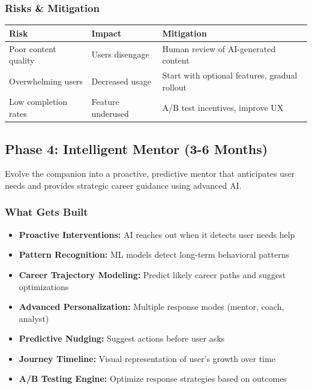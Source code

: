 \documentclass[12pt,a4paper]{article}
\begin{document}
\subsubsection{Risks \& Mitigation}

\begin{table}[h]
\centering
\begin{tabularx}{\textwidth}{|l|X|X|}
\hline
\textbf{Risk} & \textbf{Impact} & \textbf{Mitigation} \\
\hline
Poor content quality & Users disengage & Human review of AI-generated content \\
\hline
Overwhelming users & Decreased usage & Start with optional features, gradual rollout \\
\hline
Low completion rates & Feature underused & A/B test incentives, improve UX \\
\hline
\end{tabularx}
\end{table}

\newpage

\subsection{Phase 4: Intelligent Mentor (3-6 Months)}

\begin{tcolorbox}[colback=switchitpurple!5,colframe=switchitpurple,title=\textbf{Phase 4 Goal}]
Evolve the companion into a proactive, predictive mentor that anticipates user needs and provides strategic career guidance using advanced AI.
\end{tcolorbox}

\subsubsection{What Gets Built}

\begin{itemize}[leftmargin=*]
    \item \textbf{Proactive Interventions:} AI reaches out when it detects user needs help
    \item \textbf{Pattern Recognition:} ML models detect long-term behavioral patterns
    \item \textbf{Career Trajectory Modeling:} Predict likely career paths and suggest optimizations
    \item \textbf{Advanced Personalization:} Multiple response modes (mentor, coach, analyst)
    \item \textbf{Predictive Nudging:} Suggest actions before user asks
    \item \textbf{Journey Timeline:} Visual representation of user's growth over time
    \item \textbf{A/B Testing Engine:} Optimize response strategies based on outcomes
\end{itemize}
\end{document}
